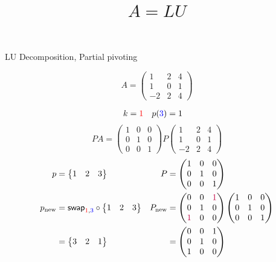 \documentclass[pdf]{beamer}
\title{$A=LU$}
\subtitle{}
\author{}
\begin{document}
\begin{frame}{}
\begin{center}LU Decomposition, Partial pivoting\end{center} $$A = \begin{pmatrix}1&2&4\\1&0&1\\-2&2&4\end{pmatrix}$$\end{frame}
\begin{frame}{}\begin{align*} k &= {\color{red}1} & p({\color{blue}3}) &= 1\end{align*} $$PA=\begin{pmatrix}1&0&0\\0&1&0\\0&0&1\end{pmatrix} P \begin{pmatrix}1&2&4\\1&0&1\\\boxed{-2}&2&4\end{pmatrix} $$ \begin{align*} p&= \begin{Bmatrix}1&2&3\end{Bmatrix} & P&= \begin{pmatrix}1&0&0\\0&1&0\\0&0&1\end{pmatrix}\\ p_{\text{new}} &= \mathsf{swap}_{{\color{red}1},{\color{blue}3}} \circ \begin{Bmatrix}1&2&3\end{Bmatrix} & P_{\text{new}} &= \begin{pmatrix}0&0&{\color{purple}1}\\0&1&0\\{\color{purple}1}&0&0\end{pmatrix} \begin{pmatrix}1&0&0\\0&1&0\\0&0&1\end{pmatrix}\\ &=\begin{Bmatrix}3&2&1\end{Bmatrix} &&=\begin{pmatrix}0&0&1\\0&1&0\\1&0&0\end{pmatrix}\end{align*}\end{frame}
\end{document}
